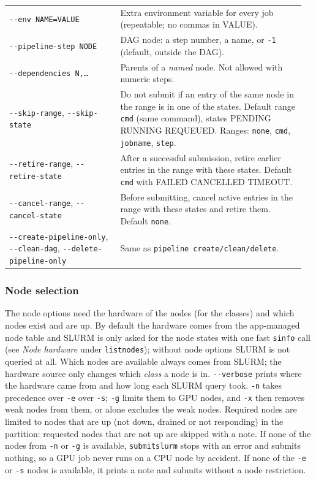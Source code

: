 \documentclass[11pt,a4paper]{article}
\newcommand{\cmd}[1]{\texttt{#1}}
\begin{document}
\begin{longtable}{@{}>{\raggedright}p{0.36\linewidth}>{\raggedright\arraybackslash}p{0.6\linewidth}@{}}
\cmd{-{}-env NAME=VALUE} & Extra environment variable for every job (repeatable; no commas in VALUE). \\
\cmd{-{}-pipeline-step NODE} & DAG node: a step number, a name, or \cmd{-1} (default, outside the DAG). \\
\cmd{-{}-dependencies N,\ldots} & Parents of a \emph{named} node. Not allowed with numeric steps. \\
\midrule
\cmd{-{}-skip-range}, \cmd{-{}-skip-state} & Do not submit if an entry of the same node in the range is in one of the states. Default range \cmd{cmd} (same command), states PENDING RUNNING REQUEUED. Ranges: \cmd{none}, \cmd{cmd}, \cmd{jobname}, \cmd{step}. \\
\cmd{-{}-retire-range}, \cmd{-{}-retire-state} & After a successful submission, retire earlier entries in the range with these states. Default \cmd{cmd} with FAILED CANCELLED TIMEOUT. \\
\cmd{-{}-cancel-range}, \cmd{-{}-cancel-state} & Before submitting, cancel active entries in the range with these states and retire them. Default \cmd{none}. \\
\midrule
\cmd{-{}-create-pipeline-only}, \cmd{-{}-clean-dag}, \cmd{-{}-delete-pipeline-only} & Same as \cmd{pipeline create/clean/delete}. \\
\bottomrule
\end{longtable}

\subsubsection*{Node selection}

The node options need the hardware of the nodes (for the classes) and which nodes exist and are
up. By default the hardware comes from the app-managed node table and SLURM is only asked for the
node states with one fast \cmd{sinfo} call (see \emph{Node hardware} under \cmd{listnodes}); without
node options SLURM is not queried at all. Which nodes are available always comes from SLURM; the
hardware source only changes which \emph{class} a node is in. \cmd{-{}-verbose} prints where the
hardware came from and how long each SLURM query took. \cmd{-n} takes precedence over \cmd{-e} over
\cmd{-s}; \cmd{-g} limits them to GPU nodes, and \cmd{-x} then removes weak nodes from them, or
alone excludes the weak nodes. Required nodes are limited to nodes that are up (not down, drained
or not responding) in the partition: requested nodes that are not up are skipped with a note.
If none of the nodes from \cmd{-n} or \cmd{-g} is available, \cmd{submitslurm} stops with an
error and submits nothing, so a GPU job never runs on a CPU node by accident. If none of the
\cmd{-e} or \cmd{-s} nodes is available, it prints a note and submits without a node restriction.
\end{document}
